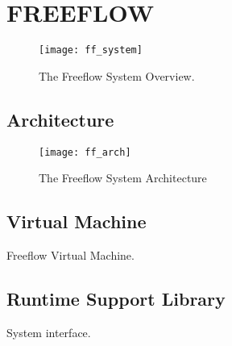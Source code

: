 \chapter{FREEFLOW}
\label{ff}

\begin{figure}[h]
\centering
\texttt{[image: ff\_system]}
\caption{The Freeflow System Overview.}
\label{fig:ff_sys}
\end{figure}

\section{Architecture}
\label{ff:arch}
\begin{figure}[h]
\centering
\texttt{[image: ff\_arch]}
\caption{The Freeflow System Architecture}
\label{fig:ff_arch}
\end{figure}

\section{Virtual Machine}
\label{ff:vm}
Freeflow Virtual Machine.

\section{Runtime Support Library}
\label{ff:runtime}
System interface.

